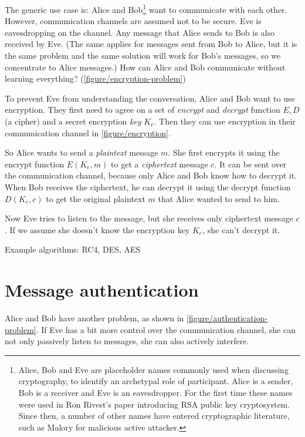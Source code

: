 The generic use case is: Alice and Bob\footnote{Alice, Bob and Eve are placeholder names commonly used when discussing cryptography, to identify an archetypal role of participant. Alice is a sender, Bob is a receiver and Eve is an eavesdropper. For the first time these names were used in Ron Rivest's paper introducing RSA public key cryptosystem. \cite{rsa} Since then, a number of other names have entered cryptographic literature, such as Malory for malicious active attacker.} want to communicate with each other. However, communication channels are assumed not to be secure. Eve is eavesdropping on the channel. Any message that Alice sends to Bob is also received by Eve. (The same applies for messages sent from Bob to Alice, but it is the same problem and the same solution will work for Bob's messages, so we concentrate to Alice messages.) How can Alice and Bob communicate without learning everything? (\autoref{figure/encryption-problem}) \cite[p.~23]{ferguson2010cryptography}

To prevent Eve from understanding the conversation, Alice and Bob want to use encryption. They first need to agree on a set of \textit{encrypt} and \textit{decrypt} function $E, D$ (a cipher) and a secret encryption \textit{key} $K_e$. Then they can use encryption in their communication channel in \autoref{figure/encryption}.

So Alice wants to send a \textit{plaintext} message $m$. She first encrypts it using the encrypt function $E(K_e, m)$ to get a \textit{ciphertext} message $c$. It can be sent over the communication channel, because only Alice and Bob know how to decrypt it. When Bob receives the ciphertext, he can decrypt it using the decrypt function $D(K_e, c)$ to get the original plaintext $m$ that Alice wanted to send to him.

Now Eve tries to listen to the message, but she receives only ciphertext message $c$. If we assume she doesn't know the encryption key $K_e$, she can't decrypt it.

Example algorithms: RC4, DES, AES

\section{Message authentication}
\label{toc/message-authentication}




Alice and Bob have another problem, as shown in \autoref{figure/authentication-problem}. If Eve has a bit more control over the communication channel, she can not only passively listen to messages, she can also actively interfere.

